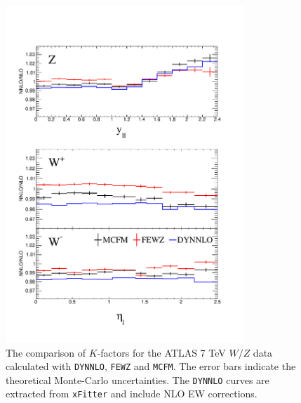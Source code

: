 \begin{figure}[bhtp]
\begin{center}
\includegraphics[width=0.8\textwidth]{fig/fig2/ATL7WZ_KF.pdf}
\caption{The comparison of $K$-factors for the ATLAS 7 TeV $W/Z$ data calculated with \texttt{DYNNLO}, \texttt{FEWZ} and \texttt{MCFM}. The error bars indicate the theoretical Monte-Carlo uncertainties. The \texttt{DYNNLO} curves are extracted from \texttt{xFitter} and include NLO EW corrections.} 
\label{fig:Kfactors}
\end{center}
\end{figure}

